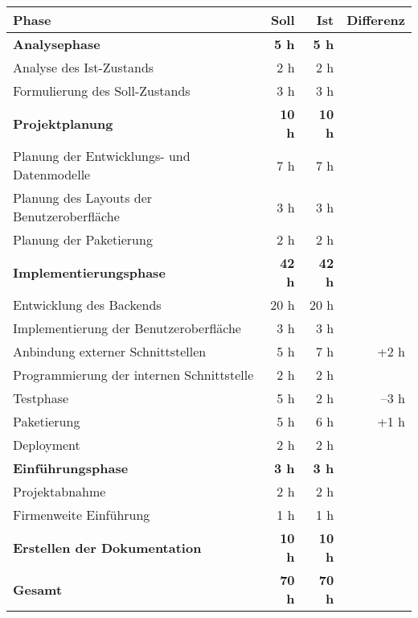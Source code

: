 \begin{tabularx}{\textwidth}{Xrrr}
\rowcolor{odd}\textbf{Phase} & \textbf{Soll} & \textbf{Ist} & \textbf{Differenz} \\
\hline
\hline
\rowcolor{heading}\textbf{Analysephase} & \textbf{5 h} & \textbf{5 h} & \textbf{} \\
Analyse des Ist-Zustands & 2 h      & 2 h   &  \\
\rowcolor{odd}Formulierung des Soll-Zustands & 3 h      & 3 h   &  \\
\rowcolor{heading}\textbf{Projektplanung} & \textbf{10 h} & \textbf{10 h} & \textbf{} \\
Planung der Entwicklungs- und Datenmodelle & 7 h      & 7 h   &  \\
\rowcolor{odd}Planung des Layouts der Benutzeroberfläche & 3 h      & 3 h   &  \\
Planung der Paketierung & 2 h      & 2 h   &  \\
\rowcolor{heading}\textbf{Implementierungsphase} & \textbf{42 h} & \textbf{42 h} & \textbf{} \\
Entwicklung des Backends & 20 h      & 20 h   &  \\
\rowcolor{odd} Implementierung der Benutzeroberfläche & 3 h      & 3 h   &  \\
Anbindung externer Schnittstellen & 5 h      & 7 h  & +2 h \\
\rowcolor{odd}Programmierung der internen Schnittstelle & 2 h      & 2 h   &  \\
Testphase & 5 h      & 2 h   &  –3 h\\
\rowcolor{odd}Paketierung & 5 h     & 6 h   & +1 h \\
Deployment & 2 h      & 2 h   &  \\
\rowcolor{heading}\textbf{Einführungsphase} & \textbf{3 h} & \textbf{3 h} & \textbf{} \\
Projektabnahme & 2 h      & 2 h   &  \\
\rowcolor{odd}Firmenweite Einführung & 1 h    & 1 h   &  \\
\rowcolor{heading}\textbf{Erstellen der Dokumentation} & \textbf{10 h} & \textbf{10 h} & \textbf{} \\
\hline
\hline
\rowcolor{odd}\textbf{Gesamt} & \textbf{70 h} & \textbf{70 h} & \textbf{} \\
\end{tabularx}
